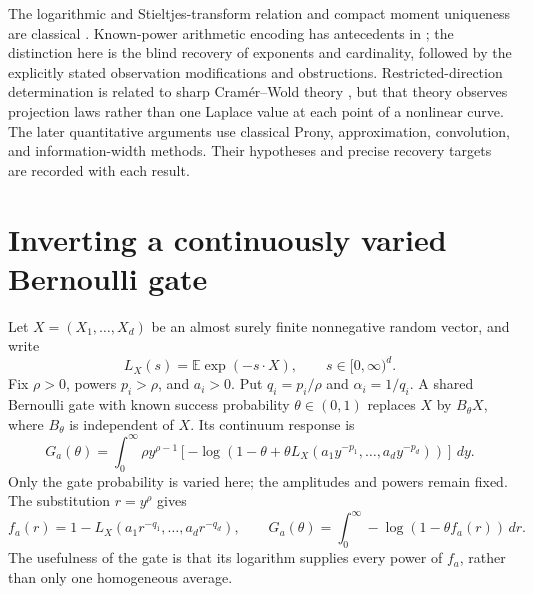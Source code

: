 \documentclass[11pt,letterpaper]{article}
\theoremstyle{definition}
\theoremstyle{remark}
\newcommand{\E}{\mathbb E}
\newcommand{\1}{\mathbf 1}
\begin{document}
The logarithmic and Stieltjes-transform relation and compact moment
uniqueness are classical
\cite{TulinoVerdu2004,Rao2007,Hausdorff1921}.
Known-power arithmetic encoding has antecedents in
\cite{Lin2016,Lenzi2026}; the distinction here is the blind recovery
of exponents and cardinality, followed by the explicitly stated
observation modifications and obstructions. Restricted-direction
determination is related to sharp Cram\'er--Wold theory
\cite{Cuesta2007}, but that theory observes projection laws rather than
one Laplace value at each point of a nonlinear curve. The later
quantitative arguments use classical Prony, approximation, convolution,
and information-width methods. Their hypotheses and precise recovery
targets are recorded with each result.

\section{Inverting a continuously varied Bernoulli gate}
\label{p07:sec:gate-tomography}

Let $X=(X_1,\ldots,X_d)$ be an almost surely finite nonnegative random
vector, and write
\[
 L_X(s)=\E\exp(-s\cdot X),\qquad s\in[0,\infty)^d.
\]
Fix $\rho>0$, powers $p_i>\rho$, and $a_i>0$. Put
$q_i=p_i/\rho$ and $\alpha_i=1/q_i$. A shared Bernoulli gate with
known success probability $\theta\in(0,1)$ replaces $X$ by $B_\theta X$,
where $B_\theta$ is independent of $X$. Its continuum response is
\begin{equation}\label{p07:eq:gate-response}
 G_a(\theta)=\int_0^\infty \rho y^{\rho-1}
 \left[-\log\left(1-\theta+
 \theta L_X(a_1y^{-p_1},\ldots,a_dy^{-p_d})\right)\right]\,dy.
\end{equation}
Only the gate probability is varied here; the amplitudes and powers remain
fixed. The substitution $r=y^\rho$ gives
\begin{equation}\label{p07:eq:gate-f}
 f_a(r)=1-L_X(a_1r^{-q_1},\ldots,a_dr^{-q_d}),\qquad
 G_a(\theta)=\int_0^\infty-\log(1-\theta f_a(r))\,dr.
\end{equation}
The usefulness of the gate is that its logarithm supplies every power of
$f_a$, rather than only one homogeneous average.
\end{document}

